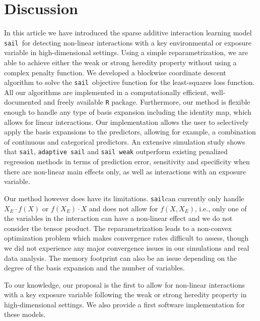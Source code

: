 \documentclass[12pt,letter]{article}\usepackage[]{graphicx}\usepackage[]{color}
\newcommand{\sail}{\texttt{sail}}
\begin{document}
\section{Discussion} \label{sec:sail_discussion}

In this article we have introduced the sparse additive interaction learning model \sail ~for detecting non-linear interactions with a key environmental or exposure variable in high-dimensional settings.
Using a simple reparametrization, we are able to achieve either the weak or strong heredity property without using a complex penalty function. We developed a blockwise coordinate descent algorithm to solve the \sail ~objective function for the least-squares loss function.
All our algorithms are implemented in a computationally efficient, well-documented and freely available \texttt{R} package.
Furthermore, our method is flexible enough to handle any type of basis expansion including the identity map, which allows for linear interactions.
Our implementation allows the user to selectively apply the basis expansions to the predictors, allowing for example, a combination of continuous and categorical predictors.
An extensive simulation study shows that \sail, \texttt{adaptive sail} and \texttt{sail weak} outperform existing penalized regression methods in terms of prediction error, sensitivity and specificity when there are non-linear main effects only, as well as interactions with an exposure variable.

Our method however does have its limitations. \sail can currently only handle $X_E \cdot f(X)$ or $f(X_E) \cdot X$ and does not allow for $f(X, X_E)$, i.e., only one of the variables in the interaction can have a non-linear effect and we do not consider the tensor product. The reparametrization leads to a non-convex optimization problem which makes convergence rates difficult to assess, though we did not experience any major convergence issues in our simulations and real data analysis. The memory footprint can also be an issue depending on the degree of the basis expansion and the number of variables.

To our knowledge, our proposal is the first to allow for non-linear interactions with a key exposure variable following the weak or strong heredity property in high-dimensional settings. We also provide a first software implementation for these models.
\end{document}
